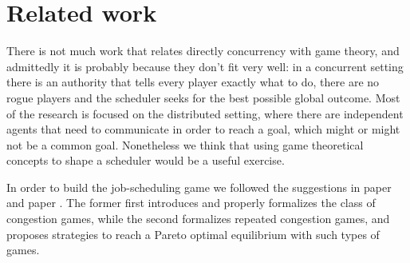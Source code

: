 \section{Related work}

There is not much work that relates directly concurrency with game theory,
and admittedly it is probably because they don't fit very well: in a concurrent
setting there is an authority that tells every player exactly what to do,
there are no rogue players and the scheduler seeks for the best possible global
outcome. Most of the research is focused on the distributed setting, where
there are independent agents that need to communicate in order to reach a 
goal, which might or might not be a common goal.
Nonetheless we think that using game theoretical concepts to shape a scheduler
would be a useful exercise. 

In order to build the job-scheduling game we followed the suggestions in paper \cite{rosenthal_class_1973}
and paper \cite{10.1145/1807406.1807411}. The former first introduces and properly formalizes the class of congestion
games, while the second formalizes repeated congestion games, and proposes strategies
to reach a Pareto optimal equilibrium with such types of games.

